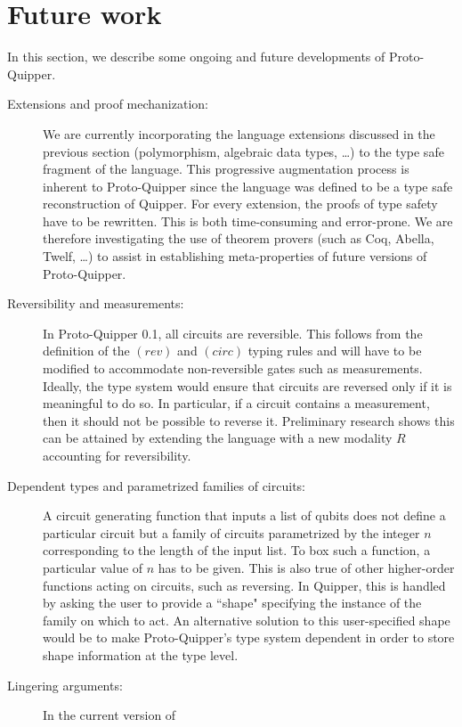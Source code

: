 \documentclass{article}
\begin{document}
\section{Future work}

In this section, we describe some ongoing and future developments 
of Proto-Quipper.
\begin{description}
  \item[Extensions and proof mechanization:] We are 
    currently incorporating the language extensions discussed 
    in the previous section (polymorphism, algebraic data types, 
    \ldots) to the type safe fragment of the language. This 
    progressive augmentation process is inherent to Proto-Quipper 
    since the language was defined to be a type safe 
    reconstruction of Quipper. For every extension, the proofs 
    of type safety have to be rewritten. This is both time-consuming 
    and error-prone. We are therefore investigating the use 
    of theorem provers (such as Coq, Abella, Twelf, \ldots) to assist 
    in establishing meta-properties of future versions of 
    Proto-Quipper. 
  \item[Reversibility and measurements:] In Proto-Quipper 
    0.1, all circuits are reversible. This follows from the 
    definition of the $(rev)$ and $(circ)$ typing rules and will 
    have to be modified to accommodate non-reversible gates such 
    as measurements. Ideally, the type system would ensure that 
    circuits are reversed only if it is meaningful to do so. In 
    particular, if a circuit contains a measurement, then it 
    should not be possible to reverse it. Preliminary research 
    shows this can be attained by extending the language with a 
    new modality $R$ accounting for reversibility. 
  \item[Dependent types and parametrized families of circuits:] 
    A circuit generating function that inputs a list of qubits does not 
    define a particular circuit but a family of circuits parametrized 
    by the integer $n$ corresponding to the length of the input list.
    To box such a function, a particular value of $n$ has to be given. 
    This is also true of other higher-order functions acting on circuits, 
    such as reversing. In Quipper, this is handled by asking the user 
    to provide a ``shape" specifying the instance of the family on 
    which to act. An alternative solution to this user-specified shape 
    would be to make Proto-Quipper's type system dependent in order to 
    store shape information at the type level.
  \item[Lingering arguments:] In the current version of 

\end{description}
\end{document}
